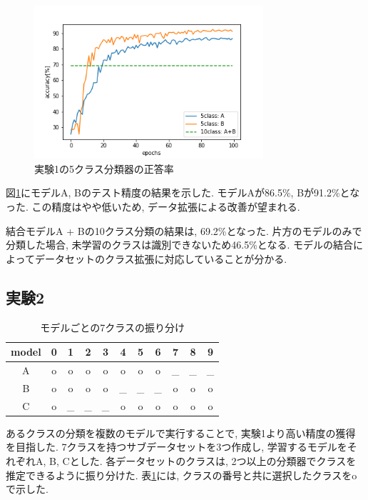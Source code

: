 \documentclass[twocolumn]{jarticle}     %
\begin{document}
\begin{figure}[tb]
	\begin{center}
		\includegraphics[clip,width=8.5cm]{accuracy5.png}
		\caption{実験1の5クラス分類器の正答率}
		\label{fig:accuracy5}
	\end{center}
\end{figure}

図\ref{fig:accuracy5}にモデルA, Bのテスト精度の結果を示した.
モデルAが86.5\%, Bが91.2\%となった. この精度はやや低いため, データ拡張による改善が望まれる.

結合モデルA + Bの10クラス分類の結果は, 69.2\%となった.
片方のモデルのみで分類した場合, 未学習のクラスは識別できないため46.5\%となる.
モデルの結合によってデータセットのクラス拡張に対応していることが分かる.

\subsection{実験2}

\begin{table}[tb]
  \begin{center}
    \caption{モデルごとの7クラスの振り分け}
    \begin{tabular}{|c||c|c|c|c|c|c|c|c|c|c|} \hline
      model & 0 & 1 & 2 & 3 & 4 & 5 & 6 & 7 & 8 & 9 \\ \hline\hline
      A     & o & o & o & o & o & o & o & _ & _ & _ \\ \hline
      B     & o & o & o & o & _ & _ & _ & o & o & o \\ \hline
      C     & o & _ & _ & _ & o & o & o & o & o & o \\ \hline
    \end{tabular}
    \label{tab:class7}
  \end{center}
\end{table}

あるクラスの分類を複数のモデルで実行することで, 実験1より高い精度の獲得を目指した.
7クラスを持つサブデータセットを3つ作成し, 学習するモデルをそれぞれA, B, Cとした.
各データセットのクラスは, 2つ以上の分類器でクラスを推定できるように振り分けた.
表\ref{tab:class7}には, クラスの番号と共に選択したクラスをoで示した.
\end{document}
